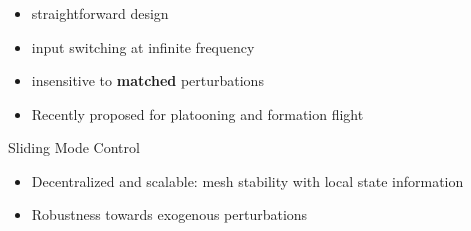 \documentclass[12pt,svgnames,table,draft=false]{beamer}
\begin{document}

\begin{frame}\frametitle{}
\centering

\begin{tcolorbox}[colback=blue!5!white,colframe=blue!75!black,title=Ideal Sliding Mode Control, width=20em,
standard jigsaw,
opacityback=.7]
\begin{itemize}
\item straightforward design
\item input switching at infinite frequency
\item insensitive to \textbf{matched} perturbations
\item Recently proposed for platooning \cite{Fahimi2007} and formation flight \cite{galzi2006uav}
\end{itemize}
\end{tcolorbox}

\end{frame}


\usebackgroundtemplate{}
\begin{frame}{Sliding Mode Control}
\centering

\begin{tcolorbox}[colback=blue!5!white,colframe=blue!75!black,title=Potential Benefits, width=20em,
standard jigsaw,
opacityback=.7]
\begin{itemize}
\item Decentralized and scalable: mesh stability with local state information
\item Robustness towards exogenous perturbations
\end{itemize}
\end{tcolorbox}
\end{frame}
\end{document}
